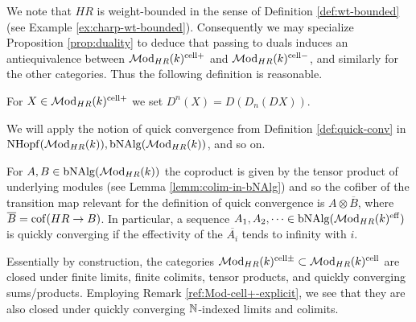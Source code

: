 \documentclass{amsart}
\numberwithin{proposition}{section}
\numberwithin{equation}{section}
\def\cell{\mathrm{cell}}
\def\NHopf{\mathrm{NHopf}}
\def\bNAlg{\mathrm{bNAlg}}
\begin{document}
We note that $HR$ is weight-bounded in the sense of Definition \ref{def:wt-bounded} (see Example \ref{ex:charp-wt-bounded}).
Consequently we may specialize Proposition \ref{prop:duality} to deduce that passing to duals induces an antiequivalence between $\Mod_{HR}(k)^{\cell+}$ and $\Mod_{HR}(k)^{\cell-}$, and similarly for the other categories.
Thus the following definition is reasonable.
\begin{definition}
For $X \in \Mod_{HR}(k)^{\cell+}$ we set $D^n(X) = D(D_n(DX))$.
\end{definition}

We will apply the notion of quick convergence from Definition \ref{def:quick-conv} in $\NHopf(\Mod_{HR}(k)), \bNAlg(\Mod_{HR}(k))$, and so on.
\begin{example}
For $A, B \in \bNAlg(\Mod_{HR}(k))$ the coproduct is given by the tensor product of underlying modules (see Lemma \ref{lemm:colim-in-bNAlg}) and so the cofiber of the transition map relevant for the definition of quick convergence is $A \otimes \overline{B}$, where $\overline{B} = \operatorname{cof}(HR \to B)$.
In particular, a sequence $A_1, A_2, \dots \in \bNAlg(\Mod_{HR}(k)^\eff)$ is quickly converging if the effectivity of the $\overline{A_i}$ tends to infinity with $i$.
\end{example}

\begin{remark} \label{rmk:closure-under-quickly-conv}
Essentially by construction, the categories $\Mod_{HR}(k)^{\cell\pm} \subset \Mod_{HR}(k)^\cell$ are closed under finite limits, finite colimits, tensor products, and quickly converging sums/products.
Employing Remark \ref{ref:Mod-cell+-explicit}, we see that they are also closed under quickly converging $\mathbb{N}$-indexed limits and colimits.
\end{remark}
\end{document}
